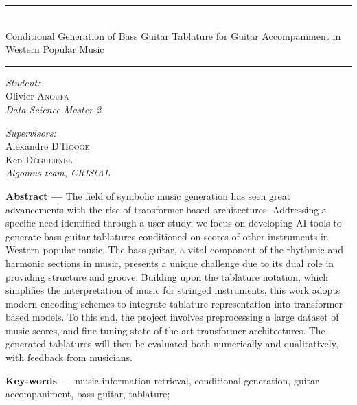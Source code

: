 \begin{titlepage}
\begin{minipage}{\linewidth}
\huge
\bfseries
\centering
\rule{\linewidth}{1.5pt}\\
Conditional Generation of Bass Guitar Tablature for Guitar Accompaniment in Western Popular Music\\[-3mm]
\rule{\linewidth}{1.5pt}
\end{minipage}

\vfill

\begin{minipage}{.45\linewidth}
\textit{Student:}\\
Olivier \textsc{Anoufa}\\
\textit{Data Science Master 2}

\end{minipage}
\hfill
\begin{minipage}{.45\linewidth}
\flushright
\textit{Supervisors:}\\
Alexandre \textsc{D'Hooge}\\
Ken \textsc{Déguernel}\\
\textit{Algomus team, CRIStAL}
\end{minipage}

\vfill

\begin{flushleft}
\justify
\textbf{Abstract ---} The field of symbolic music generation has seen great advancements with the rise of transformer-based architectures.
Addressing a specific need identified through a user study, we focus on developing AI tools to generate bass guitar tablatures conditioned on scores of other instruments in Western popular music.
The bass guitar, a vital component of the rhythmic and harmonic sections in music, presents a unique challenge due to its dual role in providing structure and groove.
Building upon the tablature notation, which simplifies the interpretation of music for stringed instruments, this work adopts modern encoding schemes to integrate tablature representation into transformer-based models.
To this end, the project involves preprocessing a large dataset of music scores, and fine-tuning state-of-the-art transformer architectures.
The generated tablatures will then be evaluated both numerically and qualitatively, with feedback from musicians.
\vspace{.5\baselineskip}\\
\end{flushleft}
\vfill


\begin{flushleft}
\textbf{Key-words ---} music information retrieval, conditional generation, guitar accompaniment, bass guitar, tablature;
\vspace{.5\baselineskip}\\
\end{flushleft}
\vfill


\end{titlepage}
